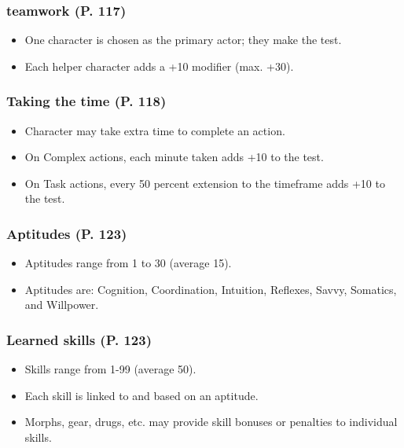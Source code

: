 \subsubsection{teamwork (P. 117)}

\begin{itemize}
\item One character is chosen as the primary actor; they make the test.
\item Each helper character adds a +10 modifier (max. +30).
\end{itemize}

\subsubsection{Taking the time (P. 118)}

\begin{itemize}
\item Character may take extra time to complete an action.
\item On Complex actions, each minute taken adds +10 to the test.
\item On Task actions, every 50 percent extension to the timeframe adds +10 to the test.
\end{itemize}

\subsubsection{Aptitudes (P. 123)}

\begin{itemize}
\item Aptitudes range from 1 to 30 (average 15).
\item Aptitudes are: Cognition, Coordination, Intuition, Reflexes, Savvy, Somatics, and Willpower.
\end{itemize}

\subsubsection{Learned skills (P. 123)}

\begin{itemize}
\item Skills range from 1-99 (average 50).
\item Each skill is linked to and based on an aptitude.
\item Morphs, gear, drugs, etc. may provide skill bonuses or penalties to individual skills.
\end{itemize}

